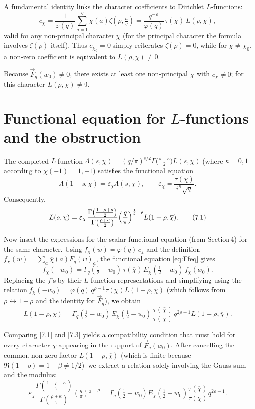 \documentclass[12pt,a4paper]{article}
\theoremstyle{definition}
\begin{document}
A fundamental identity links the character coefficients to Dirichlet \(L\)-functions:
\[
c_\chi = \frac{1}{\varphi(q)} \sum_{a=1}^q \overline{\chi}(a) \zeta(\rho,\tfrac{a}{q})
      = \frac{q^{-\rho}}{\varphi(q)}\, \tau(\overline{\chi})\, L(\rho,\chi),
\]
valid for any non‑principal character \(\chi\) (for the principal character the formula involves \(\zeta(\rho)\) itself).  Thus \(c_{\chi_0}=0\) simply reiterates \(\zeta(\rho)=0\), while for \(\chi\neq\chi_0\), a non‑zero coefficient is equivalent to \(L(\rho,\chi)\neq 0\).

Because \(\vec{F}_q(w_0)\neq 0\), there exists at least one non‑principal \(\chi\) with \(c_\chi\neq 0\); for this character \(L(\rho,\chi)\neq 0\).

\section{Functional equation for \(L\)-functions and the obstruction}

The completed \(L\)-function \(\Lambda(s,\chi) = (q/\pi)^{s/2} \Gamma\bigl(\frac{s+\kappa}{2}\bigr) L(s,\chi)\) (where \(\kappa=0,1\) according to \(\chi(-1)=1,-1\)) satisfies the functional equation
\[
\Lambda(1-s,\overline{\chi}) = \varepsilon_\chi \Lambda(s,\chi),\qquad
\varepsilon_\chi = \frac{\tau(\chi)}{i^\kappa \sqrt{q}}.
\]
Consequently,
\[
L(\rho,\chi) = \varepsilon_\chi \,
   \frac{\Gamma\bigl(\frac{1-\rho+\kappa}{2}\bigr)}{\Gamma\bigl(\frac{\rho+\kappa}{2}\bigr)}
   \Bigl(\frac{q}{\pi}\Bigr)^{\frac12 - \rho}
   L(1-\rho,\overline{\chi}). \tag{7.1}
\]

Now insert the expressions for the scalar functional equation (from Section 4) for the same character.  Using \(f_\chi(w) = \varphi(q)\,c_\chi\) and the definition \(f_\chi(w) = \sum_a \overline{\chi}(a) F_q(w)_a\), the functional equation \eqref{eq:Ffeq} gives
\[
f_\chi(-w_0) = \Gamma_q(\tfrac12-w_0)\, \tau(\overline{\chi})\, E_\chi(\tfrac12-w_0)\, f_{\overline{\chi}}(w_0). \tag{7.2}
\]
Replacing the \(f\)'s by their \(L\)-function representations and simplifying using the relation \(f_\chi(-w_0) = \varphi(q)\, q^{\rho-1} \tau(\overline{\chi}) L(1-\rho,\chi)\) (which follows from \(\rho\leftrightarrow 1-\rho\) and the identity for \(\vec{F}_q\)), we obtain
\[
L(1-\rho,\chi) = \Gamma_q(\tfrac12-w_0)\, E_\chi(\tfrac12-w_0)\,
                \frac{\tau(\overline{\chi})}{\tau(\chi)}\,
                q^{2\rho-1} L(1-\rho,\overline{\chi}). \tag{7.3}
\]

Comparing \eqref{7.1} and \eqref{7.3} yields a compatibility condition that must hold for every character \(\chi\) appearing in the support of \(\vec{F}_q(w_0)\).  After cancelling the common non‑zero factor \(L(1-\rho,\overline{\chi})\) (which is finite because \(\Re(1-\rho)=1-\beta \neq 1/2\)), we extract a relation solely involving the Gauss sum and the modulus:
\[
\varepsilon_\chi \frac{\Gamma(\frac{1-\rho+\kappa}{2})}{\Gamma(\frac{\rho+\kappa}{2})} (\tfrac{q}{\pi})^{\frac12-\rho}
   = \Gamma_q(\tfrac12-w_0) E_\chi(\tfrac12-w_0) \frac{\tau(\overline{\chi})}{\tau(\chi)} q^{2\rho-1}. \tag{7.4}
\]
\end{document}
